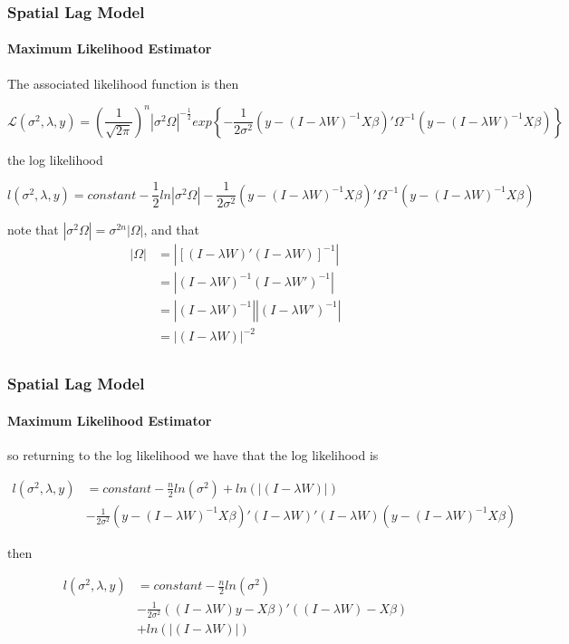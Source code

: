 \documentclass[
  shownotes,
  xcolor={svgnames},
  hyperref={colorlinks,citecolor=DarkBlue,linkcolor=DarkRed,urlcolor=DarkBlue}
  ]{beamer}
\begin{document}
\begin{frame}[fragile]
\frametitle{Spatial Lag Model}
\framesubtitle{Maximum Likelihood Estimator}


The associated likelihood function is then
\begin{scriptsize}
\begin{equation}
\mathcal{L}\left(\sigma^{2},\lambda,y\right)=\left(\frac{1}{\sqrt{2\pi}}\right)^{n}|\sigma^{2}\Omega|^{-\frac{1}{2}}exp\left\{ -\frac{1}{2\sigma^{2}}(y-(I-\lambda W)^{-1}X\beta)'\Omega^{-1}(y-(I-\lambda W)^{-1}X\beta)\right\}  \nonumber
\end{equation}
\end{scriptsize}


the log likelihood

\begin{scriptsize}
\begin{equation}
l\left(\sigma^{2},\lambda,y\right)=constant-\frac{1}{2}ln|\sigma^{2}\Omega|-\frac{1}{2\sigma^{2}}(y-(I-\lambda W)^{-1}X\beta)'\Omega^{-1}(y-(I-\lambda W)^{-1}X\beta) \nonumber
\end{equation}
\end{scriptsize}

note that $|\sigma^{2}\Omega|=\sigma^{2n}|\Omega|$, and that 
\begin{align}
|\Omega| &= |[(I-\lambda W)'(I-\lambda W)]^{-1}| \nonumber \\
&= |(I-\lambda W)^{-1}(I-\lambda W')^{-1}| \nonumber \\
&=|(I-\lambda W)^{-1}||(I-\lambda W')^{-1}| \nonumber \\
&=|(I-\lambda W)|^{-2} \nonumber \\
\end{align}

\end{frame}
\begin{frame}[fragile]
\frametitle{Spatial Lag Model}
\framesubtitle{Maximum Likelihood Estimator}


so returning to the log likelihood we have that  the log likelihood is 

\begin{align}
l\left(\sigma^{2},\lambda,y\right)&=constant-\frac{n}{2}ln\left(\sigma^{2}\right)+ln\left(|(I-\lambda W)|\right) \nonumber \\
&-\frac{1}{2\sigma^{2}}(y-(I-\lambda W)^{-1}X\beta)'(I-\lambda W)'(I-\lambda W)(y-(I-\lambda W)^{-1}X\beta)
\end{align}

then 

\begin{align}
l\left(\sigma^{2},\lambda,y\right)&=constant-\frac{n}{2}ln\left(\sigma^{2}\right) \nonumber \\
&-\frac{1}{2\sigma^{2}}((I-\lambda W)y-X\beta)'((I-\lambda W)-X\beta) \nonumber \\
&+ln\left(|(I-\lambda W)|\right)
\end{align}


\end{frame}
\end{document}
